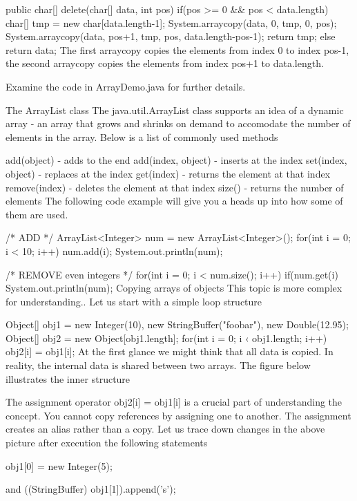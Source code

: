 public char[] delete(char[] data, int pos)
{
    if(pos >= 0 && pos < data.length)
    {
        char[] tmp = new char[data.length-1];
        System.arraycopy(data, 0, tmp, 0, pos);
        System.arraycopy(data, pos+1, tmp, pos, data.length-pos-1);
        return tmp;
    }
    else
        return data;
}
The first arraycopy copies the elements from index 0 to index pos-1, the second arraycopy copies the elements from index pos+1 to data.length.

Examine the code in ArrayDemo.java for further details.

The ArrayList class
The java.util.ArrayList class supports an idea of a dynamic array - an array that grows and shrinks on demand to accomodate the number of elements in the array. Below is a list of commonly used methods

add(object) - adds to the end
add(index, object) - inserts at the index
set(index, object) - replaces at the index
get(index) - returns the element at that index
remove(index) - deletes the element at that index
size() - returns the number of elements
The following code example will give you a heads up into how some of them are used.

/* ADD */
      ArrayList<Integer> num = new ArrayList<Integer>();
      for(int i = 0; i < 10; i++) num.add(i);
      System.out.println(num);


/* REMOVE even integers */
      for(int i = 0; i < num.size(); i++)
        if(num.get(i)%
      System.out.println(num);
Copying arrays of objects
This topic is more complex for understanding.. Let us start with a simple loop structure

Object[] obj1 = {new Integer(10),
                new StringBuffer("foobar"),
                new Double(12.95)};
Object[] obj2 = new Object[obj1.length];
for(int i = 0; i ‹ obj1.length; i++)
    obj2[i] = obj1[i];
At the first glance we might think that all data is copied. In reality, the internal data is shared between two arrays. The figure below illustrates the inner structure



The assignment operator obj2[i] = obj1[i] is a crucial part of understanding the concept. You cannot copy references by assigning one to another. The assignment creates an alias rather than a copy. Let us trace down changes in the above picture after execution the following statements

obj1[0] = new Integer(5);


and ((StringBuffer) obj1[1]).append('s');



